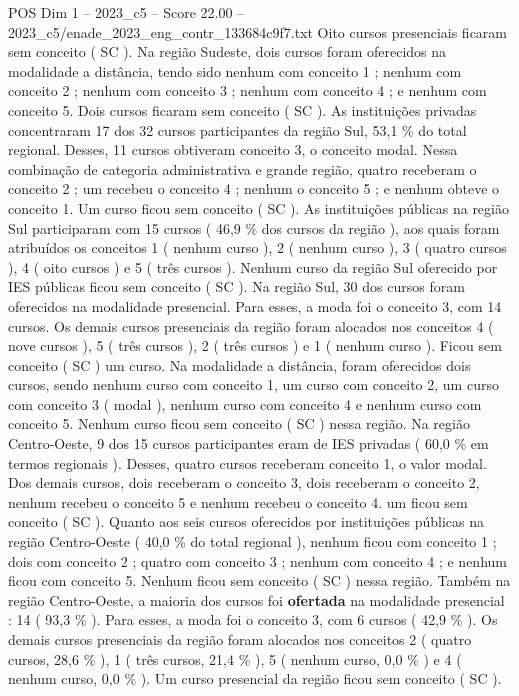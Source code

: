\begin{textsample}{POS Dim 1 – 2023\_c5 – Score 22.00 – 2023\_c5/enade\_2023\_eng\_contr\_133684c9f7.txt}
Oito cursos presenciais ficaram sem conceito ( SC ).
Na região Sudeste, dois cursos foram oferecidos na modalidade a distância, tendo sido nenhum com conceito 1 ; nenhum com conceito 2 ; nenhum com conceito 3 ; nenhum com conceito 4 ; e nenhum com conceito 5.
Dois cursos ficaram sem conceito ( SC ).
As instituições privadas concentraram 17 dos 32 cursos participantes da região Sul, 53,1 \% do total regional.
Desses, 11 cursos obtiveram conceito 3, o conceito modal.
Nessa combinação de categoria administrativa e grande região, quatro receberam o conceito 2 ; um recebeu o conceito 4 ; nenhum o conceito 5 ; e nenhum obteve o conceito 1.
Um curso ficou sem conceito ( SC ).
As instituições públicas na região Sul participaram com 15 cursos ( 46,9 \% dos cursos da região ), aos quais foram atribuídos os conceitos 1 ( nenhum curso ), 2 ( nenhum curso ), 3 ( quatro cursos ), 4 ( oito cursos ) e 5 ( três cursos ).
Nenhum curso da região Sul oferecido por IES públicas ficou sem conceito ( SC ).
Na região Sul, 30 dos cursos foram oferecidos na modalidade presencial.
Para esses, a moda foi o conceito 3, com 14 cursos.
Os demais cursos presenciais da região foram alocados nos conceitos 4 ( nove cursos ), 5 ( três cursos ), 2 ( três cursos ) e 1 ( nenhum curso ).
Ficou sem conceito ( SC ) um curso.
Na modalidade a distância, foram oferecidos dois cursos, sendo nenhum curso com conceito 1, um curso com conceito 2, um curso com conceito 3 ( modal ), nenhum curso com conceito 4 e nenhum curso com conceito 5.
Nenhum curso ficou sem conceito ( SC ) nessa região.
Na região Centro-Oeste, 9 dos 15 cursos participantes eram de IES privadas ( 60,0 \% em termos regionais ).
Desses, quatro cursos receberam conceito 1, o valor modal.
Dos demais cursos, dois receberam o conceito 3, dois receberam o conceito 2, nenhum recebeu o conceito 5 e nenhum recebeu o conceito 4. um ficou sem conceito ( SC ).
Quanto aos seis cursos oferecidos por instituições públicas na região Centro-Oeste ( 40,0 \% do total regional ), nenhum ficou com conceito 1 ; dois com conceito 2 ; quatro com conceito 3 ; nenhum com conceito 4 ; e nenhum ficou com conceito 5.
Nenhum ficou sem conceito ( SC ) nessa região.
Também na região Centro-Oeste, a maioria dos cursos foi \textbf{ofertada} na modalidade presencial : 14 ( 93,3 \% ).
Para esses, a moda foi o conceito 3, com 6 cursos ( 42,9 \% ).
Os demais cursos presenciais da região foram alocados nos conceitos 2 ( quatro cursos, 28,6 \% ), 1 ( três cursos, 21,4 \% ), 5 ( nenhum curso, 0,0 \% ) e 4 ( nenhum curso, 0,0 \% ).
Um curso presencial da região ficou sem conceito ( SC ).

\end{textsample}
